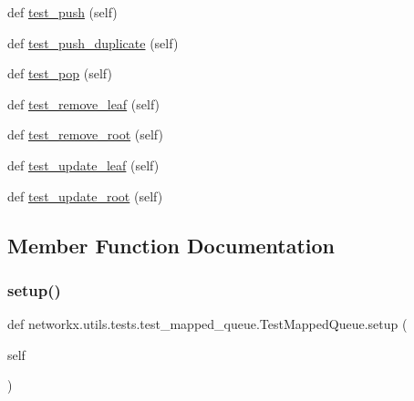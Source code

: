 \begin{DoxyCompactItemize}
\item 
def \hyperlink{classnetworkx_1_1utils_1_1tests_1_1test__mapped__queue_1_1TestMappedQueue_aacf1dcd61a7beb57c788c4904350bcff}{test\+\_\+push} (self)
\item 
def \hyperlink{classnetworkx_1_1utils_1_1tests_1_1test__mapped__queue_1_1TestMappedQueue_ace794c27e5e6bb2c9eb167218403bc7d}{test\+\_\+push\+\_\+duplicate} (self)
\item 
def \hyperlink{classnetworkx_1_1utils_1_1tests_1_1test__mapped__queue_1_1TestMappedQueue_a4befb23aab539e0cff69f89c555c14f8}{test\+\_\+pop} (self)
\item 
def \hyperlink{classnetworkx_1_1utils_1_1tests_1_1test__mapped__queue_1_1TestMappedQueue_a0ac1cb8331733b9e9884a7e079940ea4}{test\+\_\+remove\+\_\+leaf} (self)
\item 
def \hyperlink{classnetworkx_1_1utils_1_1tests_1_1test__mapped__queue_1_1TestMappedQueue_ae80e93a0fbc4f4f4d9683296f4ad5958}{test\+\_\+remove\+\_\+root} (self)
\item 
def \hyperlink{classnetworkx_1_1utils_1_1tests_1_1test__mapped__queue_1_1TestMappedQueue_ac213fbefcd1d65c73d29c1f7ab949a90}{test\+\_\+update\+\_\+leaf} (self)
\item 
def \hyperlink{classnetworkx_1_1utils_1_1tests_1_1test__mapped__queue_1_1TestMappedQueue_af31001534f293bb877d1e7b8105fb9b2}{test\+\_\+update\+\_\+root} (self)
\end{DoxyCompactItemize}


\subsection{Member Function Documentation}
\mbox{\label{classnetworkx_1_1utils_1_1tests_1_1test__mapped__queue_1_1TestMappedQueue_a844d5063c1a6078d59e3dde7d2eb2bcd}} 
\subsubsection{\texorpdfstring{setup()}{setup()}}
{\footnotesize\ttfamily def networkx.\+utils.\+tests.\+test\+\_\+mapped\+\_\+queue.\+Test\+Mapped\+Queue.\+setup (\begin{DoxyParamCaption}\item[{}]{self }\end{DoxyParamCaption})}

